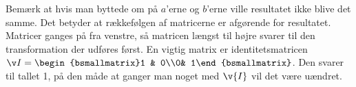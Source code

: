 Bemærk at hvis man byttede om på $a$'erne og $b$'erne ville resultatet ikke blive det samme. Det betyder at rækkefølgen af matricerne er afgørende for resultatet. Matricer ganges på fra venstre, så matricen længst til højre svarer til den transformation der udføres først.
En vigtig matrix er identitetsmatricen $\v I= \begin{bsmallmatrix}1 & 0\\0& 1\end{bsmallmatrix}$. Den svarer til tallet 1, på den måde at ganger man noget med $\v{I}$ vil det være uændret. 